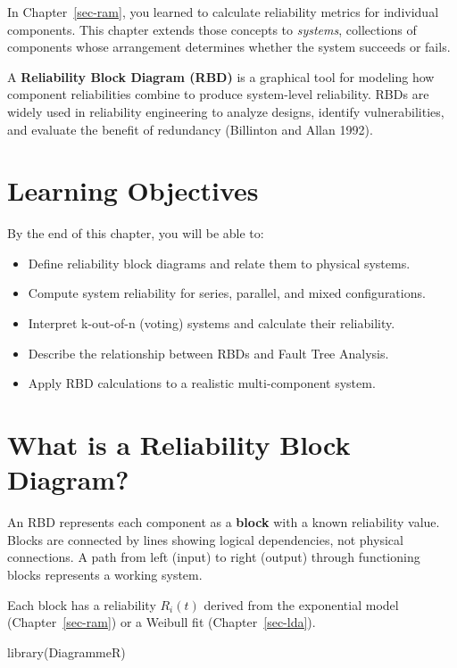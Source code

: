\documentclass[
  letterpaper,
  DIV=11,
  numbers=noendperiod]{scrreprt}
\newenvironment{Shaded}{\begin{snugshade}}{\end{snugshade}}
\newcommand{\FunctionTok}[1]{\textcolor[rgb]{0.28,0.35,0.67}{#1}}
\newcommand{\NormalTok}[1]{\textcolor[rgb]{0.00,0.23,0.31}{#1}}
\providecommand{\tightlist}{%
  \setlength{\itemsep}{0pt}\setlength{\parskip}{0pt}}
\begin{document}
In Chapter~\ref{sec-ram}, you learned to calculate reliability metrics
for individual components. This chapter extends those concepts to
\emph{systems}, collections of components whose arrangement determines
whether the system succeeds or fails.

A \textbf{Reliability Block Diagram (RBD)} is a graphical tool for
modeling how component reliabilities combine to produce system-level
reliability. RBDs are widely used in reliability engineering to analyze
designs, identify vulnerabilities, and evaluate the benefit of
redundancy (Billinton and Allan 1992).

\section{Learning Objectives}\label{learning-objectives-1}

By the end of this chapter, you will be able to:

\begin{itemize}
\tightlist
\item
  Define reliability block diagrams and relate them to physical systems.
\item
  Compute system reliability for series, parallel, and mixed
  configurations.
\item
  Interpret k-out-of-n (voting) systems and calculate their reliability.
\item
  Describe the relationship between RBDs and Fault Tree Analysis.
\item
  Apply RBD calculations to a realistic multi-component system.
\end{itemize}

\section{What is a Reliability Block
Diagram?}\label{what-is-a-reliability-block-diagram}

An RBD represents each component as a \textbf{block} with a known
reliability value. Blocks are connected by lines showing logical
dependencies, not physical connections. A path from left (input) to
right (output) through functioning blocks represents a working system.

Each block has a reliability \(R_i(t)\) derived from the exponential
model (Chapter~\ref{sec-ram}) or a Weibull fit (Chapter~\ref{sec-lda}).

\begin{Shaded}
\begin{Highlighting}[]
\FunctionTok{library}\NormalTok{(DiagrammeR)}
\end{Highlighting}
\end{Shaded}
\end{document}

